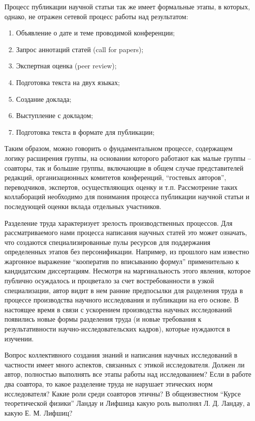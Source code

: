 Процесс публикации научной статьи так же имеет формальные этапы, в которых, однако, не отражен сетевой процесс работы над результатом:
\begin{enumerate}
\tightlist
\item Объявление о дате и теме проводимой конференции;
\item Запрос аннотаций статей (call for papers);
\item Экспертная оценка (peer review);
\item Подготовка текста на двух языках;
\item Создание доклада;
\item Выступление с докладом;
\item Подготовка текста в формате для публикации;
\end{enumerate}

Таким образом, можно говорить о фундаментальном процессе, содержащем логику расширения группы, на основании которого работают как малые группы – соавторы, так и большие группы, включающие в общем случае представителей редакций, организационных комитетов конференций, ``гостевых авторов'', переводчиков, экспертов, осуществляющих оценку и т.п. Рассмотрение таких коллабораций необходимо для понимания процесса публикации научной статьи и последующей оценки вклада отдельных участников.

Разделение труда характеризует зрелость производственных процессов. Для рассматриваемого нами процесса написания научных статей это может означать, что создаются специализированные пулы ресурсов для поддержания определенных этапов без персонификации. Например, из прошлого нам известно жаргонное выражение ``кооператив по вписыванию формул'' применительно к кандидатским диссертациям. Несмотря на маргинальность этого явления, которое публично осуждалось и процветало за счет востребованности в узкой специализации, автор видит в нем ранние предпосылки для разделения труда в процессе производства научного исследования и публикации на его основе. В настоящее время в связи с ускорением производства научных исследований появились новые формы разделения труда (и новые требования к результативности научно-исследовательских кадров), которые нуждаются в изучении.

Вопрос коллективного создания знаний и написания научных исследований в частности имеет много аспектов, связанных с этикой исследователя. Должен ли автор, полностью выполнять все этапы работы над исследованием? Если в работе два соавтора, то какое разделение труда не нарушает этических норм исследователя? Какие роли среди соавторов этичны? В общеизвестном ``Курсе теоретической физики'' Ландау и Лифшица какую роль выполнял Л. Д. Ландау, а какую Е. М. Лифшиц?

